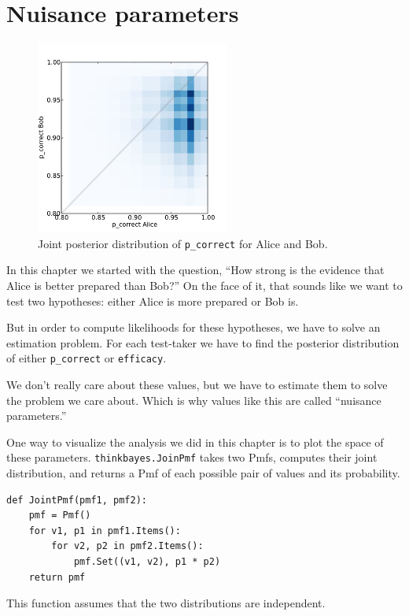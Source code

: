 \documentclass[12pt]{book}
\begin{document}
\section{Nuisance parameters}

\begin{figure}
\centerline{\includegraphics[height=2.5in]{figs/sat_joint.pdf}}
\caption{Joint posterior distribution of {\tt p\_correct} for Alice and Bob.}
\label{fig.satjoint}
\end{figure}

In this chapter we started with the question,
``How strong is the evidence that Alice is better prepared
than Bob?''  On the face of it, that sounds like we want to
test two hypotheses: either Alice is more prepared or Bob is.

But in order to compute likelihoods for these hypotheses, we
have to solve an estimation problem.  For each test-taker
we have to find the posterior distribution of either
\verb"p_correct" or \verb"efficacy".

We don't really care about these values, but we have
to estimate them to solve the problem we care about.  Which
is why values like this are called ``nuisance parameters.''

One way to visualize the analysis we did in this chapter is
to plot the space of these parameters.  \verb"thinkbayes.JoinPmf"
takes two Pmfs, computes their joint distribution, and returns
a Pmf of each possible pair of values and its probability.

\begin{verbatim}
def JointPmf(pmf1, pmf2):
    pmf = Pmf()
    for v1, p1 in pmf1.Items():
        for v2, p2 in pmf2.Items():
            pmf.Set((v1, v2), p1 * p2)
    return pmf
\end{verbatim}

This function assumes that the two distributions are independent.
\end{document}
